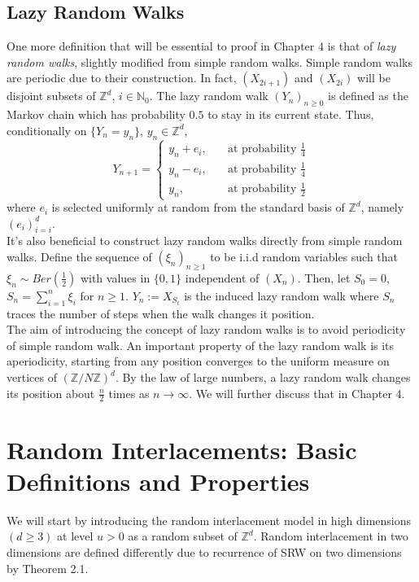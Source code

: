 \documentclass[
11pt, %
a4paper, %
oneside, %
headinclude,footinclude, %
BCOR5mm, %
]{scrartcl}
\begin{document}
\subsection{Lazy Random Walks}
One more definition that will be essential to proof in Chapter $4$ is that of \textit{lazy random walks}, slightly modified from simple random walks. Simple random walks are periodic due to their construction. In fact, $(X_{2i+1})$ and $(X_{2i})$ will be disjoint subsets of $\mathbb{Z}^d$, $i \in \mathbb{N}_0$. The lazy random walk $(Y_n)_{n \geq 0}$ is defined as the Markov chain which has probability $0.5$ to stay in its current state. Thus, conditionally on $\{Y_n = y_n\}$, $y_n \in \mathbb{Z}^d$,
\begin{equation}
Y_{n+1} =\left\{
\begin{aligned}
y_n + e_i, & \quad \text{at probability } \frac{1}{4}\\
y_n - e_i, & \quad \text{at probability } \frac{1}{4}\\
y_n, & \quad \text{at probability } \frac{1}{2}
\end{aligned}
\right.\tag{2.18}
\end{equation}
where $e_i$ is selected uniformly at random from the standard basis of $\mathbb{Z}^d$, namely $\left(e_i\right)_{i=i}^d$. 
\vspace{0.6em}\\ It's also beneficial to construct lazy random walks directly from simple random walks. Define the sequence of $(\xi_n)_{n \geq 1}$ to be i.i.d random variables such that $\xi_n \sim Ber(\frac{1}{2})$ with values in $\{0,1\}$ independent of $(X_n)$. Then, let $S_0=0$, $S_n=\sum_{i=1}^n\xi_i$ for $n \geq 1$. $Y_n := X_{S_t}$ is the induced lazy random walk where $S_n$ traces the number of steps when the walk changes it position.
\vspace{0.6em}\\ The aim of introducing the concept of lazy random walks is to avoid periodicity of simple random walk. An important property of the lazy random walk is its aperiodicity, starting from any position converges to the uniform measure on vertices of $(\mathbb{Z}/N\mathbb{Z})^d$. By the law of large numbers, a lazy random walk changes its position about $\frac{n}{2}$ times as $n \rightarrow \infty$. We will further discuss that in Chapter 4.
\section{Random Interlacements: Basic Definitions and Properties}
We will start by introducing the random interlacement model in high dimensions $(d \geq 3)$ at level $u>0$ as a random subset of $\mathbb{Z}^d$. Random interlacement in two dimensions are defined differently due to recurrence of SRW on two dimensions by Theorem 2.1.
\end{document}
